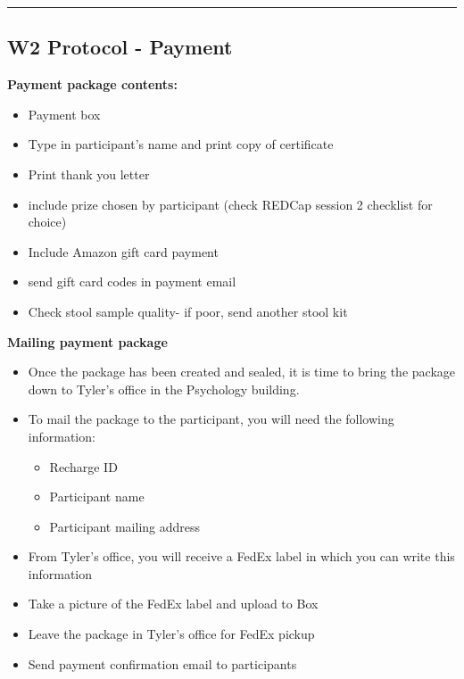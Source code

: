 \documentclass[
]{book}
\providecommand{\tightlist}{%
  \setlength{\itemsep}{0pt}\setlength{\parskip}{0pt}}
\begin{document}
\begin{center}\rule{0.5\linewidth}{0.5pt}\end{center}

\hypertarget{w2-protocol---payment-1}{%
\subsection{W2 Protocol - Payment}\label{w2-protocol---payment-1}}

\textbf{Payment package contents:}

\begin{itemize}
\tightlist
\item
  Payment box
\item
  Type in participant's name and print copy of certificate
\item
  Print thank you letter
\item
  include prize chosen by participant (check REDCap session 2 checklist for choice)
\item
  Include Amazon gift card payment
\item
  send gift card codes in payment email
\item
  Check stool sample quality- if poor, send another stool kit
\end{itemize}

\textbf{Mailing payment package}

\begin{itemize}
\tightlist
\item
  Once the package has been created and sealed, it is time to bring the package down to Tyler's office in the Psychology building.
\item
  To mail the package to the participant, you will need the following information:

  \begin{itemize}
  \tightlist
  \item
    Recharge ID
  \item
    Participant name
  \item
    Participant mailing address
  \end{itemize}
\item
  From Tyler's office, you will receive a FedEx label in which you can write this information
\item
  Take a picture of the FedEx label and upload to Box
\item
  Leave the package in Tyler's office for FedEx pickup
\item
  Send payment confirmation email to participants
\end{itemize}
\end{document}

